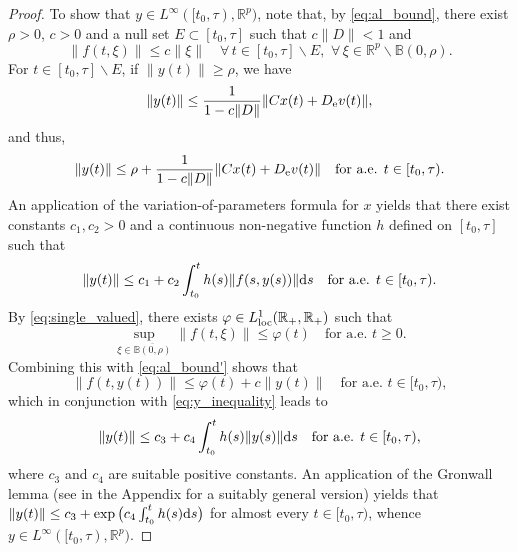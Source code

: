 \documentclass[a4paper,11pt]{article}
\newcommand{\B}{\mathbb B}
\newcommand{\R}{\mathbb R}
\numberwithin{equation}{section}
\numberwithin{figure}{section}
\numberwithin{table}{section}
\begin{document}
\begin{proof}
To show that $y\in L^\infty([t_0,\tau),\R^p)$, note that, by \eqref{eq:al_bound}, there exist $\rho>0$, $c>0$ and a null set $E\subset[t_0,\tau]$
such that $c\|D\|<1$ and
\begin{equation}\label{eq:al_bound'}
\|f(t,\xi)\|\leq c\|\xi\|\quad\forall\,t\in [t_0,\tau]\backslash E,\,\,\forall\,\xi\in\R^p\backslash\B(0,\rho).
\end{equation}
For $t\in [t_0,\tau]\backslash E$, if $\|y(t)\|\geq\rho$, we have
\[
\|y(t)\|\leq\frac{1}{1-c\|D\|}\|Cx(t)+D_{\rm e}v(t)\|,
\]
and thus,
\[
\|y(t)\|\leq\rho+\frac{1}{1-c\|D\|}\|Cx(t)+D_{\rm e}v(t)\|\quad\mbox{for a.e. $t\in[t_0,\tau)$.}
\]
An application of the variation-of-parameters formula for $x$ yields that there
exist constants $c_1,c_2>0$ and a continuous non-negative function $h$ defined
on $[t_0,\tau]$ such that
\begin{equation}\label{eq:y_inequality}
\|y(t)\|\leq c_1+c_2\int_{t_0}^th(s)\|f(s,y(s))\|{\rm d}s\quad\mbox{for a.e. $t\in[t_0,\tau)$.}
\end{equation}
By \eqref{eq:single_valued}, there exists $\varphi\in L^1_{\rm loc}(\R_+,\R_+)$ such that
\[
\sup_{\xi\in\overline{\B(0,\rho)}}\|f(t,\xi)\|\leq\varphi(t)\quad\mbox{for a.e. $t\geq 0$}.
\]
Combining this with \eqref{eq:al_bound'} shows that
\[
\|f(t,y(t))\|\leq\varphi(t)+c\|y(t)\|\quad\mbox{for a.e. $t\in[t_0,\tau)$},
\]
which in conjunction with \eqref{eq:y_inequality} leads to
\[
\|y(t)\|\leq c_3+c_4\int_{t_0}^th(s)\|y(s)\|{\rm d}s\quad\mbox{for a.e. $t\in[t_0,\tau)$,}
\]
where $c_3$ and $c_4$ are suitable positive constants. An application of the Gronwall lemma (see  in the Appendix for a suitably general version) yields that $\|y(t)\|\leq c_3+\exp\big(c_4\int_{t_0}^t h(s){\rm d}s\big)$ for almost every $t\in [t_0,\tau)$, whence
$y\in L^\infty([t_0,\tau),\R^p)$.
\end{proof}
%
%
\end{document}
